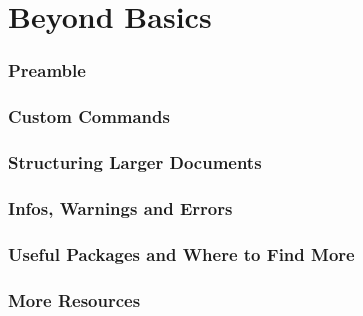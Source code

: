 \part{Beyond Basics}
\section{Preamble}

\section{Custom Commands}

\section{Structuring Larger Documents}

\section{Infos, Warnings and Errors}

\section{Useful Packages and Where to Find More}

\section{More Resources}

